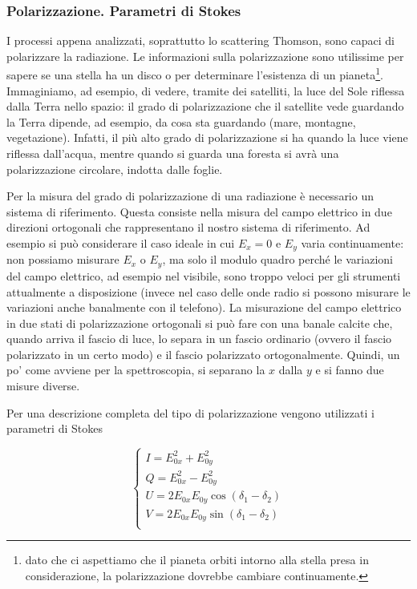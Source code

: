 \subsubsection{Polarizzazione. Parametri di Stokes}
I processi appena analizzati, soprattutto lo scattering Thomson, sono capaci di polarizzare la radiazione. Le informazioni sulla polarizzazione sono utilissime per sapere se una stella ha un disco o per determinare l'esistenza di un pianeta\footnote{dato che ci aspettiamo che il pianeta orbiti intorno alla stella presa in considerazione, la polarizzazione dovrebbe cambiare continuamente.}. Immaginiamo, ad esempio, di vedere, tramite dei satelliti, la luce del Sole riflessa dalla Terra nello spazio: il grado di polarizzazione che il satellite vede guardando la Terra dipende, ad esempio, da cosa sta guardando (mare, montagne, vegetazione). Infatti, il più alto grado di polarizzazione si ha quando la luce viene riflessa dall'acqua, mentre quando si guarda una foresta si avrà una polarizzazione circolare, indotta dalle foglie.

Per la misura del grado di polarizzazione di una radiazione è necessario un sistema di riferimento. Questa consiste nella misura del campo elettrico in due direzioni ortogonali che rappresentano il nostro sistema di riferimento. Ad esempio si può considerare il caso ideale in cui $E_x=0$ e $E_y$ varia continuamente: non possiamo misurare $E_x$ o $E_y$, ma solo il modulo quadro perché le variazioni del campo elettrico, ad esempio nel visibile, sono troppo veloci per gli strumenti attualmente a disposizione (invece nel caso delle onde radio si possono misurare le variazioni anche banalmente con il telefono). La misurazione del campo elettrico in due stati di polarizzazione ortogonali si può fare con una banale calcite che, quando arriva il fascio di luce, lo separa in un fascio ordinario (ovvero il fascio polarizzato in un certo modo) e il fascio polarizzato ortogonalmente. Quindi, un po' come avviene per la spettroscopia, si separano la $x$ dalla $y$ e si fanno due misure diverse.

Per una descrizione completa del tipo di polarizzazione vengono utilizzati i parametri di Stokes

\begin{equation}
  \begin{cases}
    I={E_{0x}^2} + {E_{0y}^2}\\
    Q={E_{0x}^2} - {E_{0y}^2}\\
    U=2E_{0x}E_{0y} \cos(\delta_1 - \delta_2)\\
    V=2E_{0x}E_{0y} \sin(\delta_1 - \delta_2)\\
  \end{cases}
\end{equation}

